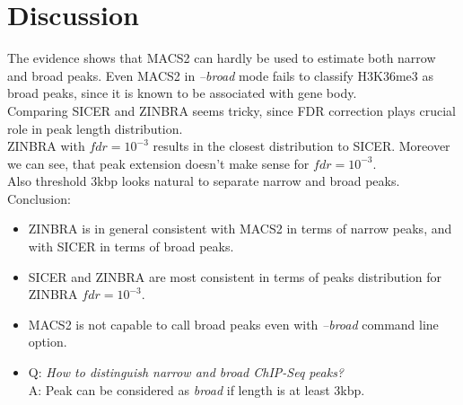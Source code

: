 \documentclass{article}
\begin{document}
\section{Discussion}
The evidence shows that MACS2 can hardly be used to estimate both narrow and broad peaks. Even MACS2 in \textit{--broad} mode fails to classify H3K36me3 as broad peaks, since it is known to be associated with gene body.\\
Comparing SICER and ZINBRA seems tricky, since FDR correction plays crucial role in peak length distribution. \\
ZINBRA with $fdr=10^{-3}$ results in the closest distribution to SICER. Moreover we can see, that peak extension doesn't make sense for $fdr=10^{-3}$.\\ Also threshold 3kbp looks natural to separate narrow and broad peaks.\\

Conclusion:
\begin{itemize}
\item ZINBRA is in general consistent with MACS2 in terms of narrow peaks, and with SICER in terms of broad peaks.
\item SICER and ZINBRA are most consistent in terms of peaks distribution for ZINBRA $fdr=10^{-3}$.
\item MACS2 is not capable to call broad peaks even with \textit{--broad} command line option.
\item {Q: \textit{How to distinguish narrow and broad ChIP-Seq peaks?}\\
A: Peak can be considered as \textit{broad} if length is at least 3kbp.
}
\end{itemize} 
\end{document}
